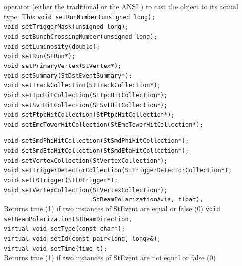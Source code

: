     operator (either the traditional \name{()} or the ANSI
    ) to cast the object to its actual type. This
    \verb+void setRunNumber(unsigned long);+\\                
    \verb+void setTriggerMask(unsigned long);+\\              
    \verb+void setBunchCrossingNumber(unsigned long);+\\      
    \verb+void setLuminosity(double);+\\               
    \verb+void setRun(StRun*);+\\                            
    \verb+void setPrimaryVertex(StVertex*);+\\                  
    \verb+void setSummary(StDstEventSummary*);+\\                        
    \verb+void setTrackCollection(StTrackCollection*);+\\                
    \verb+void setTpcHitCollection(StTpcHitCollection*);+\\               
    \verb+void setSvtHitCollection(StSvtHitCollection*);+\\               
    \verb+void setFtpcHitCollection(StFtpcHitCollection*);+\\              
    \verb+void setEmcTowerHitCollection(StEmcTowerHitCollection*);+\\              
\item[Public Operators]
    \verb+void setSmdPhiHitCollection(StSmdPhiHitCollection*);+\\              
    \verb+void setSmdEtaHitCollection(StSmdEtaHitCollection*);+\\              
    \verb+void setVertexCollection(StVertexCollection*);+\\               
    \verb+void setTriggerDetectorCollection(StTriggerDetectorCollection*);+\\      
    \verb+void setL0Trigger(StL0Trigger*);+\\                      
    \verb+void setVertexCollection(StVertexCollection*);+\\
    \verb+                         StBeamPolarizationAxis, float);+\\                   
    Returns true (1) if two instances of StEvent are equal or false (0)
    \verb+void setBeamPolarization(StBeamDirection, +\\
    \verb+virtual void setType(const char*);+\\
    \verb+virtual void setId(const pair<long, long>&);+\\
    \verb+virtual void setTime(time_t);+\\
    Returns true (1) if two instances of StEvent are not equal or false (0)
    

